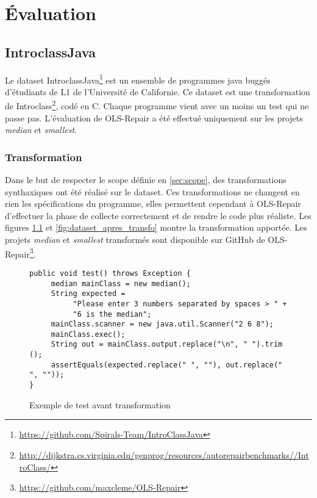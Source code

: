 
\chapter{Évaluation}
	\thispagestyle{document}

\section{IntroclassJava}

Le dataset IntroclassJava\footnote{\url{https://github.com/Spirals-Team/IntroClassJava}} est un ensemble de programmes java buggés d'étudiants de L1 de l'Université de Californie. Ce dataset est une transformation de Introclass\footnote{\url{http://dijkstra.cs.virginia.edu/genprog/resources/autorepairbenchmarks//IntroClass/}}, codé en C. Chaque programme vient avec un moins un test qui ne passe pas. L'évaluation de OLS-Repair a été effectué uniquement sur les projets \textit{median} et \textit{smallest}.

\subsection{Transformation}

Dans le but de respecter le scope définie en \ref{sec:scope}, des transformations synthaxiques ont été réalisé sur le dataset. Ces transformations ne changent en rien les spécifications du programme, elles permettent cependant à OLS-Repair d'effectuer la phase de collecte correctement et de rendre le code plus réaliste. Les figures \ref{fig:dataset_avant_transfo} et  \ref{fig:dataset_apres_transfo} montre la transformation apportée. Les projets \textit{median} et \textit{smallest} transformés sont disponible sur GitHub de OLS-Repair\footnote{\url{https://github.com/maxcleme/OLS-Repair}}.



\begin{figure}
\begin{lstlisting}
public void test() throws Exception {
     median mainClass = new median();
     String expected =
          "Please enter 3 numbers separated by spaces > " + 
          "6 is the median";
     mainClass.scanner = new java.util.Scanner("2 6 8");
     mainClass.exec();
     String out = mainClass.output.replace("\n", " ").trim ();
     assertEquals(expected.replace(" ", ""), out.replace(" ", ""));
}
\end{lstlisting}
\label{fig:dataset_avant_transfo}
\caption{Exemple de test avant transformation}
\end{figure}


